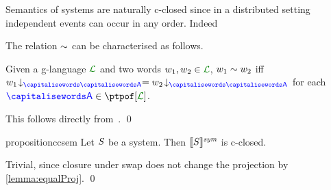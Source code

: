 Semantics of systems are naturally c-closed since in a distributed setting
independent events can occur in any order.
%
Indeed
\begin{toappendix}
The relation $\sim$ can be characterised as follows.
  \begin{lemma}\label{lemma:equalProj}
  Given a g-language $\clang$ and two words
  $\acword_1, \acword_2 \in \clang$, $w_1 \sim w_2$ iff
  $\proj{\acword_1}{\p} = \proj{\acword_2}{\p}$ for each
  $\p \in \ptpof[\clang]$.
\end{lemma}
\end{toappendix}
\begin{appendixproof}
  This follows directly from~\cite[Proposition 2.2]{Gastin90}.
  \qed
\end{appendixproof}

\begin{restatable}{proposition}{ccsem}\label{prop:par}
  Let $S$ be a system. Then ${\llbracket S \rrbracket^{\textit{sym}}}$ is
  c-closed.
\end{restatable}
\begin{toappendix}
  \ccsem*
\end{toappendix}
\begin{appendixproof}
  Trivial, since closure under swap does not change the projection by
  \cref{lemma:equalProj}.
  \qed
\end{appendixproof}




